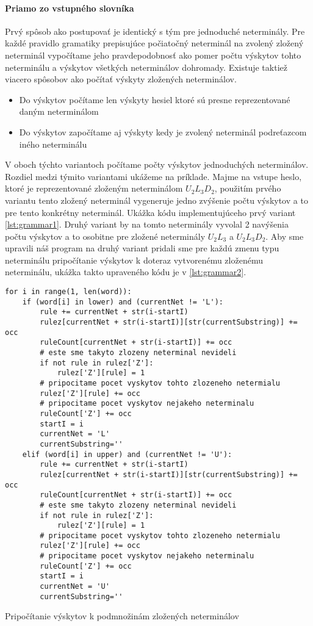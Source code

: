 \paragraph{Priamo zo vstupného slovníka}
Prvý spôsob ako postupovať je identický s tým pre jednoduché neterminály. Pre každé pravidlo gramatiky prepisujúce počiatočný neterminál na zvolený zložený neterminál vypočítame jeho pravdepodobnosť ako pomer počtu výskytov tohto neterminálu a výskytov všetkých neterminálov dohromady. Existuje taktiež viacero spôsobov ako počítať výskyty zložených neterminálov.
\begin{itemize}
	\item Do výskytov počítame len výskyty hesiel ktoré sú presne reprezentované daným neterminálom
	\item Do výskytov započítame aj výskyty kedy je zvolený neterminál podreťazcom iného neterminálu
\end{itemize}
V oboch týchto variantoch počítame počty výskytov jednoduchých neterminálov. Rozdiel medzi týmito variantami ukážeme na príklade. Majme na vstupe heslo, ktoré je reprezentované zloženým neterminálom \(U_2L_3D_2\), použitím prvého variantu tento zložený neterminál vygeneruje jedno zvýšenie počtu výskytov a to pre tento konkrétny neterminál. Ukážka kódu implementujúceho prvý variant \ref{lst:grammar1}. Druhý variant by na tomto neterminály vyvolal 2 navýšenia počtu výskytov a to osobitne pre zložené neterminály \(U_2L_3\) a \(U_2L_3D_2\). Aby sme upravili náš program na druhý variant pridali sme pre každú zmenu typu neterminálu pripočítanie výskytov k doteraz vytvorenému zloženému neterminálu, ukážka takto upraveného kódu je v \ref{lst:grammar2}.

\begin{listing}
\begin{verbatim}
for i in range(1, len(word)):
	if (word[i] in lower) and (currentNet != 'L'):
		rule += currentNet + str(i-startI)
		rulez[currentNet + str(i-startI)][str(currentSubstring)] += occ
		ruleCount[currentNet + str(i-startI)] += occ
		# este sme takyto zlozeny neterminal nevideli
		if not rule in rulez['Z']:
			rulez['Z'][rule] = 1
		# pripocitame pocet vyskytov tohto zlozeneho netermialu
		rulez['Z'][rule] += occ
		# pripocitame pocet vyskytov nejakeho neterminalu
		ruleCount['Z'] += occ
		startI = i
		currentNet = 'L'
		currentSubstring=''
	elif (word[i] in upper) and (currentNet != 'U'):
		rule += currentNet + str(i-startI)
		rulez[currentNet + str(i-startI)][str(currentSubstring)] += occ
		ruleCount[currentNet + str(i-startI)] += occ
		# este sme takyto zlozeny neterminal nevideli
		if not rule in rulez['Z']:
			rulez['Z'][rule] = 1
		# pripocitame pocet vyskytov tohto zlozeneho netermialu
		rulez['Z'][rule] += occ
		# pripocitame pocet vyskytov nejakeho neterminalu
		ruleCount['Z'] += occ
		startI = i
		currentNet = 'U'
		currentSubstring=''
\end{verbatim}
\caption{Pripočítanie výskytov k podmnožinám zložených neterminálov}
\label{lst:grammar2}
\end{listing}

